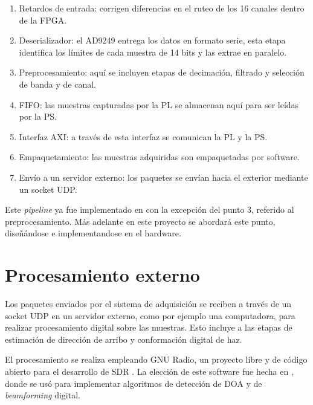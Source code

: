 \documentclass[../../main.tex]{subfiles}
\begin{document}
\begin{enumerate}
    \item Retardos de entrada: corrigen diferencias en el ruteo de los 16 canales dentro de la FPGA.
    \item Deserializador: el AD9249 entrega los datos en formato serie, esta etapa identifica los límites de cada muestra de 14 bits y las extrae en paralelo.
    \item Preprocesamiento: aquí se incluyen etapas de decimación, filtrado y selección de banda y de canal. 
    \item FIFO: las muestras capturadas por la PL se almacenan aquí para ser leídas por la PS.
    \item Interfaz AXI: a través de esta interfaz se comunican la PL y la PS.
    \item Empaquetamiento: las muestras adquiridas son empaquetadas por software.
    \item Envío a un servidor externo: los paquetes se envían hacia el exterior mediante un socket UDP.
\end{enumerate}

Este \textit{pipeline} ya fue implementado en \cite{proyecto-jose} con la excepción del punto 3, referido al preprocesamiento. Más adelante en este proyecto se abordará este punto, diseñándose e implementandose en el hardware.


\section{Procesamiento externo}\label{sec::procesamiento-externo}
Los paquetes enviados por el sistema de adquisición se reciben a través de un socket UDP en un servidor externo, como por ejemplo una computadora, para realizar procesamiento digital sobre las muestras. Esto incluye a las etapas de estimación de dirección de arribo y conformación digital de haz.

El procesamiento se realiza empleando GNU Radio, un proyecto libre y de código abierto para el desarrollo de SDR \cite{GNURadio}. La elección de este software fue hecha en \cite{proyecto-grigo}, donde se usó para implementar algoritmos de detección de DOA y de \textit{beamforming} digital.
\end{document}

